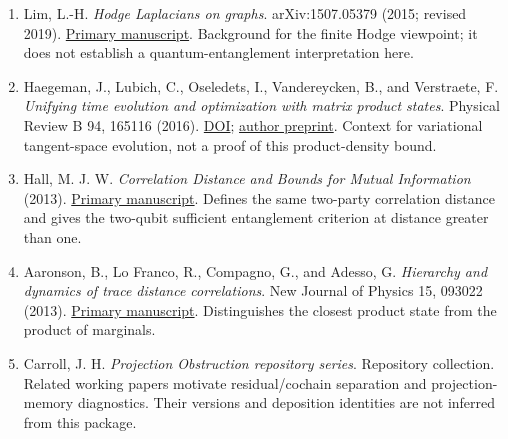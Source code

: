 \documentclass[
  11pt,
]{article}
\providecommand{\tightlist}{%
  \setlength{\itemsep}{0pt}\setlength{\parskip}{0pt}}
\providecommand{\tightlist}{%
  \setlength{\itemsep}{0pt}\setlength{\parskip}{0pt}}
\begin{document}
\begin{enumerate}
\def\labelenumi{\arabic{enumi}.}
\tightlist
\item
  Lim, L.-H. \emph{Hodge Laplacians on graphs}. arXiv:1507.05379 (2015; revised 2019).
  \href{https://arxiv.org/abs/1507.05379}{Primary manuscript}.
  Background for the finite Hodge viewpoint; it does not establish a
  quantum-entanglement interpretation here.
\item
  Haegeman, J., Lubich, C., Oseledets, I., Vandereycken, B., and Verstraete, F.
  \emph{Unifying time evolution and optimization with matrix product states}.
  Physical Review B 94, 165116 (2016).
  \href{https://doi.org/10.1103/PhysRevB.94.165116}{DOI};
  \href{https://arxiv.org/abs/1408.5056}{author preprint}.
  Context for variational tangent-space evolution, not a proof of this
  product-density bound.
\item
  Hall, M. J. W. \emph{Correlation Distance and Bounds for Mutual Information} (2013).
  \href{https://arxiv.org/html/1307.2697v1}{Primary manuscript}.
  Defines the same two-party correlation distance and gives the two-qubit
  sufficient entanglement criterion at distance greater than one.
\item
  Aaronson, B., Lo Franco, R., Compagno, G., and Adesso, G.
  \emph{Hierarchy and dynamics of trace distance correlations}.
  New Journal of Physics 15, 093022 (2013).
  \href{https://arxiv.org/abs/1307.3953}{Primary manuscript}.
  Distinguishes the closest product state from the product of marginals.
\item
  Carroll, J. H. \emph{Projection Obstruction repository series}.
  Repository collection.
  Related working papers motivate residual/cochain separation and
  projection-memory diagnostics. Their versions and deposition identities
  are not inferred from this package.
\end{enumerate}
\end{document}
